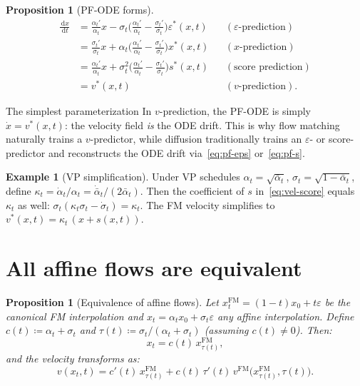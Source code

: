 \documentclass[11pt]{article}
\newcommand{\dd}{\,\mathrm{d}}
\newtheorem{proposition}[theorem]{Proposition}
\theoremstyle{definition}
\newtheorem{example}[theorem]{Example}
\theoremstyle{remark}
\begin{document}
\begin{proposition}[PF-ODE forms]\label{prop:pf-ode-param}
\begin{align}
\frac{\dd x}{\dd t} &= \frac{\alpha_t'}{\alpha_t}x - \sigma_t\Big(\frac{\alpha_t'}{\alpha_t} - \frac{\sigma_t'}{\sigma_t}\Big)\varepsilon^*(x,t) & &(\varepsilon\text{-prediction}) \label{eq:pf-eps}\\
&= \frac{\sigma_t'}{\sigma_t}x + \alpha_t\Big(\frac{\alpha_t'}{\alpha_t} - \frac{\sigma_t'}{\sigma_t}\Big)x^*(x,t) & &(x\text{-prediction}) \label{eq:pf-x}\\
&= \frac{\alpha_t'}{\alpha_t}x + \sigma_t^2\Big(\frac{\alpha_t'}{\alpha_t} - \frac{\sigma_t'}{\sigma_t}\Big)s^*(x,t) & &(\text{score prediction}) \label{eq:pf-s}\\
&= v^*(x,t) & &(v\text{-prediction}). \label{eq:pf-v}
\end{align}
\end{proposition}

\begin{keybox}{The simplest parameterization}
In $v$-prediction, the PF-ODE is simply $\dot{x} = v^*(x,t)$: the velocity field \emph{is} the ODE drift.
This is why flow matching naturally trains a $v$-predictor, while diffusion traditionally trains an $\varepsilon$- or score-predictor and reconstructs the ODE drift via~\eqref{eq:pf-eps} or~\eqref{eq:pf-s}.
\end{keybox}

\begin{example}[VP simplification]
Under VP schedules $\alpha_t = \sqrt{\bar\alpha_t}$, $\sigma_t = \sqrt{1-\bar\alpha_t}$, define $\kappa_t = \dot\alpha_t/\alpha_t = \dot{\bar\alpha}_t/(2\bar\alpha_t)$.
Then the coefficient of $s$ in~\eqref{eq:vel-score} equals $\kappa_t$ as well:
$\sigma_t(\kappa_t\sigma_t - \dot\sigma_t) = \kappa_t$.
The FM velocity simplifies to $v^*(x,t) = \kappa_t\,(x + s(x,t))$.
\end{example}

\section{All affine flows are equivalent}\label{sec:all-affine-equiv}

\begin{proposition}[Equivalence of affine flows]\label{prop:affine-equiv}
Let $x_t^{\mathrm{FM}} = (1-t)x_0 + t\varepsilon$ be the canonical FM interpolation and $x_t = \alpha_t x_0 + \sigma_t\varepsilon$ any affine interpolation.
Define $c(t) \coloneqq \alpha_t + \sigma_t$ and $\tau(t) \coloneqq \sigma_t/(\alpha_t + \sigma_t)$ (assuming $c(t)\neq 0$).
Then:
\begin{equation}\label{eq:affine-equiv}
x_t = c(t)\,x_{\tau(t)}^{\mathrm{FM}},
\end{equation}
and the velocity transforms as:
\begin{equation}\label{eq:affine-vel-equiv}
v(x_t,t) = c'(t)\,x_{\tau(t)}^{\mathrm{FM}} + c(t)\,\tau'(t)\,v^{\mathrm{FM}}\!\big(x_{\tau(t)}^{\mathrm{FM}},\tau(t)\big).
\end{equation}
\end{proposition}
\end{document}

